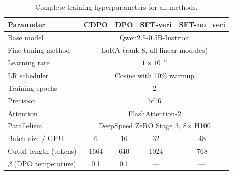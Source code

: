 \documentclass[11pt]{article}
\begin{document}
\begin{table}[H]
    \centering
    \small
    \renewcommand{\arraystretch}{1.2}
    \caption{Complete training hyperparameters for all methods.}
    \label{tab:full_hparams}
    \begin{tabular}{lcccc}
        \hline
        \textbf{Parameter}         & \textbf{CDPO}                                              & \textbf{DPO} & \textbf{SFT-veri} & \textbf{SFT-no\_veri} \\
        \hline
        Base model                 & \multicolumn{4}{c}{Qwen2.5-0.5B-Instruct}                                                                             \\
        Fine-tuning method         & \multicolumn{4}{c}{LoRA (rank 8, all linear modules)}                                                                 \\
        Learning rate              & \multicolumn{4}{c}{$1 \times 10^{-6}$}                                                                                \\
        LR scheduler               & \multicolumn{4}{c}{Cosine with 10\% warmup}                                                                           \\
        Training epochs            & \multicolumn{4}{c}{2}                                                                                                 \\
        Precision                  & \multicolumn{4}{c}{bf16}                                                                                              \\
        Attention                  & \multicolumn{4}{c}{FlashAttention-2}                                                                                  \\
        Parallelism                & \multicolumn{4}{c}{DeepSpeed ZeRO Stage 3, 8$\times$ H100}                                                            \\
        \hline
        Batch size / GPU           & 6                                                          & 16           & 32                & 48                    \\
        Cutoff length (tokens)     & 1664                                                       & 640          & 1024              & 768                   \\
        $\beta$ (DPO temperature)  & 0.1                                                        & 0.1          & ---               & ---                   \\

\end{tabular}
\end{table}
\end{document}
